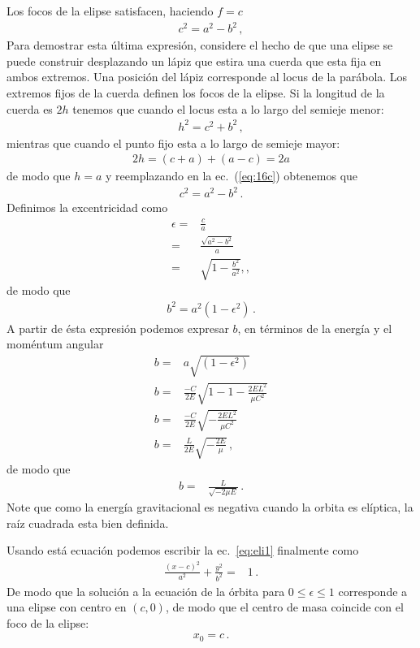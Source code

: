 Los focos de la elipse satisfacen, haciendo $f=c$
\begin{align}
  \label{eq:14c}
  c^2=a^2-b^2\,,
\end{align}
Para demostrar esta última expresión, considere el hecho de que una elipse se puede construir desplazando un lápiz que estira una cuerda que esta fija en ambos extremos. Una posición del lápiz corresponde al locus de la parábola. Los extremos fijos de la cuerda definen los focos de la elipse. Si la longitud de la cuerda es $2h$ tenemos que cuando el locus esta a lo largo del semieje menor:
\begin{align}
  \label{eq:16c}
h^2=c^2+b^2\,,
\end{align}
mientras que cuando el punto fijo esta a lo largo de semieje mayor:
\begin{align}
  2h=(c+a)+(a-c)=2a
\end{align}
de modo que $h=a$ y reemplazando en la ec.~(\ref{eq:16c}) obtenemos que
\begin{align}
  c^2=a^2-b^2\,.
\end{align}
Definimos la excentricidad como
\begin{align}
  \epsilon=&\frac{c}{a}\nonumber\\
  =&\frac{\sqrt{a^2-b^2}}{a}\nonumber\\
  =&\sqrt{1-\frac{b^2}{a^2}},,
\end{align}
de modo que
\begin{align}
  b^2=a^2(1-\epsilon^2)\,.
\end{align}
A partir de ésta expresión podemos expresar $b$, en términos de la energía y el moméntum angular
\begin{align*}
  b=&a\sqrt{(1-\epsilon^2)}\nonumber\\
  b=&\frac{-C}{2E}\sqrt{1-1-\frac{2EL^2}{\mu C^2}}\nonumber\\
  b=&\frac{-C}{2E}\sqrt{-\frac{2EL^2}{\mu C^2}}\nonumber\\
  b=&\frac{L}{2E}\sqrt{-\frac{2E}{\mu}}\,,
\end{align*}
de modo que
\begin{align}
  \label{eq:b}
  b=&\frac{L}{\sqrt{-2\mu E}}\,.
\end{align}
Note que como la energía gravitacional es negativa cuando la orbita es elíptica, la raíz cuadrada esta bien definida.

\begin{frame}
Usando está ecuación podemos escribir la ec.~\eqref{eq:eli1} finalmente como
\begin{align}
  \frac{(x-c)^2}{a^2}+\frac{y^2}{b^2}=&1\,.
\end{align}
De modo que la solución a la ecuación de la órbita para $0\le\epsilon\le 1$ corresponde a una elipse con centro en $(c,0)$, de modo que el centro de masa coincide con el foco de la elipse:
\begin{align}
  x_0=c\,.
\end{align}
\end{frame}

